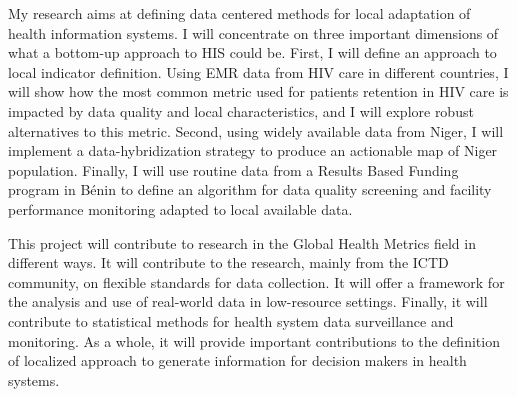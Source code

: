 \documentclass[a4paper,11pt,twoside]{article}
\begin{document}
My research aims at defining data centered methods for local adaptation of health information systems. I will concentrate on three important dimensions of what a bottom-up approach to HIS could be. First, I will define an approach to local indicator definition. Using EMR data from HIV care in different countries, I will show how the most common metric used for patients retention in HIV care is impacted by data quality and local characteristics, and I will explore robust alternatives to this metric. Second, using widely available data from Niger, I will implement a data-hybridization strategy to produce an actionable map of Niger population. Finally, I will use routine data from a Results Based Funding program in Bénin to define an algorithm for data quality screening and facility performance monitoring adapted to local available data.

This project will contribute to research in the Global Health Metrics field in different ways. It will contribute to the research, mainly from the ICTD community, on flexible standards for data collection. It will offer a framework for the analysis and use of real-world data in low-resource settings. Finally, it will contribute to statistical methods for health system data surveillance and monitoring. As a whole, it will provide important contributions to the definition of  localized approach to generate information for decision makers in health systems.

\cleardoublepage
\tableofcontents
{}
\newpage
{}
\listoffigures
\newpage

{}
\printglossaries
\thispagestyle{fancy}

\sloppy


\cleardoublepage
{}
\setcounter{page}{1}



\clearpage

\clearpage

\clearpage

\clearpage


\newpage
{}


\end{document}
